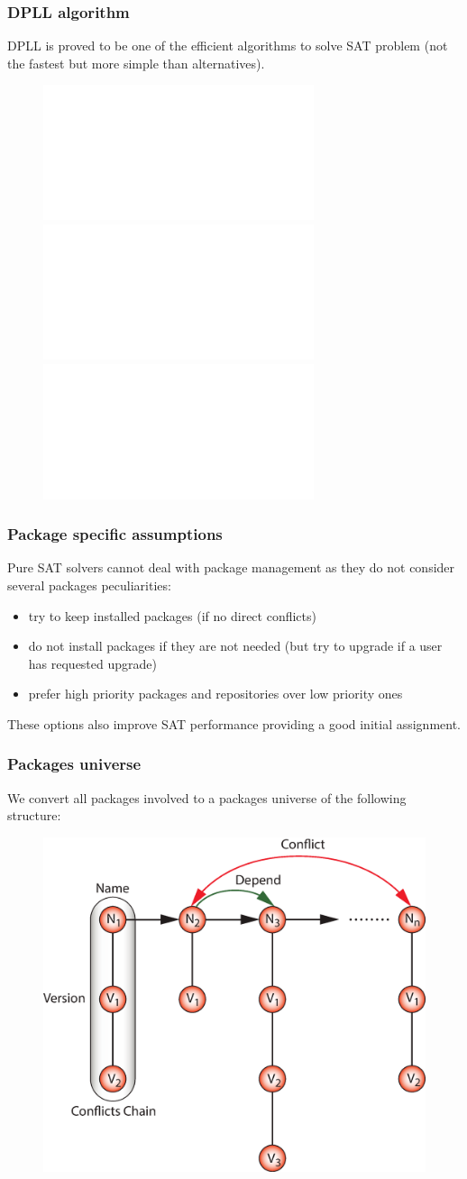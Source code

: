 \documentclass{beamer}
\begin{document}
\begin{frame}
\frametitle{DPLL algorithm}
DPLL is proved to be one of the efficient algorithms to solve SAT problem (not
the fastest but more simple than alternatives).
\begin{figure}[h!]
  \centering
  \includegraphics<1>[height=0.5\textheight]{dpll1.pdf}
  \includegraphics<2>[height=0.5\textheight]{dpll2.pdf}
  \includegraphics<3>[height=0.5\textheight]{dpll3.pdf}
\end{figure}
\end{frame}

\begin{frame}
\frametitle{Package specific assumptions}
Pure SAT solvers cannot deal with package management as they do not consider
several packages peculiarities:
\begin{itemize}
  \item try to keep installed packages (if no direct conflicts)
  \item do not install packages if they are not needed (but try to upgrade if a
  user has requested upgrade)
  \item prefer high priority packages and repositories over low priority ones
\end{itemize}
These options also improve SAT performance providing a good initial assignment.
\end{frame}

\begin{frame}
\frametitle{Packages universe}
We convert all packages involved to a packages universe of the following
structure:
\begin{figure}[h!]
  \centering
  \includegraphics[height=0.7\textheight]{q5.eps}
\end{figure}
\end{frame}
\end{document}
